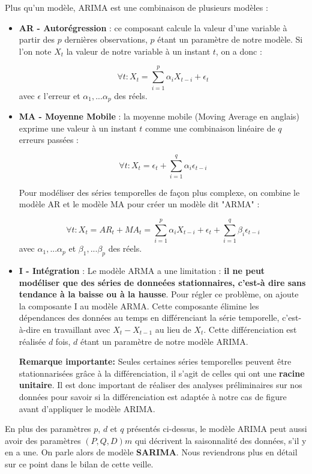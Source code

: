 \documentclass[french]{article}
\begin{document}
    Plus qu'un modèle, ARIMA est une combinaison de plusieurs modèles :
    \begin{itemize}
        \item \textbf{AR - Autorégression} : ce composant calcule la valeur d'une variable à partir des $p$ dernières observations, $p$ étant un paramètre de notre modèle. Si l'on note $X_t$ la valeur de notre variable à un instant $t$, on a donc :

        \begin{equation}\forall t : X_t = \sum_{i=1}^p \alpha_i X_{t-i} + \epsilon_t \end{equation}
        avec $\epsilon$ l'erreur et $\alpha_1,...\alpha_p$ des réels.
        \item \textbf{MA - Moyenne Mobile} : la moyenne mobile (Moving Average en anglais) exprime une valeur à un instant $t$ comme une combinaison linéaire de $q$ erreurs passées :

        \begin{equation}\forall t : X_t = \epsilon_t + \sum_{i=1}^q \alpha_i \epsilon_{t-i} \end{equation}

        Pour modéliser des séries temporelles de façon plus complexe, on combine le modèle AR et le modèle MA pour créer un modèle dit "ARMA" :

        \begin{equation}\forall t : X_t = AR_t + MA_t = \sum_{i=1}^p \alpha_i X_{t-i} + \epsilon_t + \sum_{i=1}^q \beta_i \epsilon_{t-i} \end{equation}
        avec $\alpha_1,...\alpha_p$ et $\beta_1,...\beta_p$ des réels.
        \item \textbf{I - Intégration} : Le modèle ARMA a une limitation : \textbf{il ne peut modéliser que des séries de donneées stationnaires, c'est-à dire sans tendance à la baisse ou à la hausse}. Pour régler ce problème, on ajoute la composante I au modèle ARMA.
        Cette composante élimine les dépendances des données au temps en différenciant la série temporelle, c'est-à-dire en travaillant avec $X_t - X_{t-1}$ au lieu de $X_t$. Cette différenciation est réalisée $d$ fois, $d$ étant un paramètre de notre modèle ARIMA.

        \textbf{Remarque importante: }Seules certaines séries temporelles peuvent être stationnarisées grâce à la différenciation, il s'agit de celles qui ont une \textbf{racine unitaire}. Il est donc important de réaliser des analyses préliminaires sur nos données pour savoir si la différenciation est adaptée à notre cas de figure avant d'appliquer le modèle ARIMA.

    \end{itemize}
    En plus des paramètres $p$, $d$ et $q$ présentés ci-dessus, le modèle ARIMA peut aussi avoir des paramètres $(P, Q, D)m$ qui décrivent la saisonnalité des données, s'il y en a une. On parle alors de modèle \textbf{SARIMA}. Nous reviendrons plus en détail sur ce point dans le bilan de cette veille.
\end{document}
